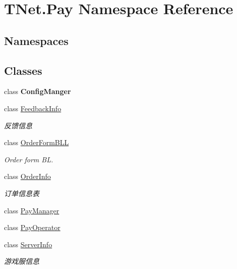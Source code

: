 \hypertarget{namespace_t_net_1_1_pay}{}\section{T\+Net.\+Pay Namespace Reference}
\label{namespace_t_net_1_1_pay}
\subsection*{Namespaces}
\begin{DoxyCompactItemize}
\end{DoxyCompactItemize}
\subsection*{Classes}
\begin{DoxyCompactItemize}
\item 
class {\bfseries Config\+Manger}
\item 
class \mbox{\hyperlink{class_t_net_1_1_pay_1_1_feedback_info}{Feedback\+Info}}
\begin{DoxyCompactList}\small\item\em 反馈信息 \end{DoxyCompactList}\item 
class \mbox{\hyperlink{class_t_net_1_1_pay_1_1_order_form_b_l_l}{Order\+Form\+B\+LL}}
\begin{DoxyCompactList}\small\item\em Order form BL. \end{DoxyCompactList}\item 
class \mbox{\hyperlink{class_t_net_1_1_pay_1_1_order_info}{Order\+Info}}
\begin{DoxyCompactList}\small\item\em 订单信息表 \end{DoxyCompactList}\item 
class \mbox{\hyperlink{class_t_net_1_1_pay_1_1_pay_manager}{Pay\+Manager}}
\item 
class \mbox{\hyperlink{class_t_net_1_1_pay_1_1_pay_operator}{Pay\+Operator}}
\item 
class \mbox{\hyperlink{class_t_net_1_1_pay_1_1_server_info}{Server\+Info}}
\begin{DoxyCompactList}\small\item\em 游戏服信息 \end{DoxyCompactList}\end{DoxyCompactItemize}
